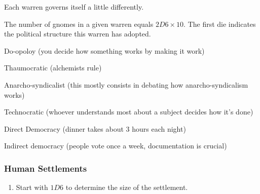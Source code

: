 \begin{multicols}{2}
Each warren governs itself a little differently.

The number of gnomes in a given warren equals $2D6\times 10$.
The first die indicates the political structure this warren has adopted.

\begin{dlist}
  \item
  Do-opoloy (you decide how something works by making it work)
  \item
  Thaumocratic (alchemists rule)
  \item
  Anarcho-syndicalist (this mostly consists in debating how anarcho-syndicalism works)
  \item
  Technocratic (whoever understands most about a subject decides how it's done)
  \item
  Direct Democracy (dinner takes about 3 hours each night)
  \item
  Indirect democracy (people vote once a week, documentation is crucial)
\end{dlist}

\subsubsection{Human Settlements}
\label{humanPoint}

\begin{enumerate}
  \item
  Start with $1D6$ to determine the size of the settlement.
\end{enumerate}
\end{multicols}
